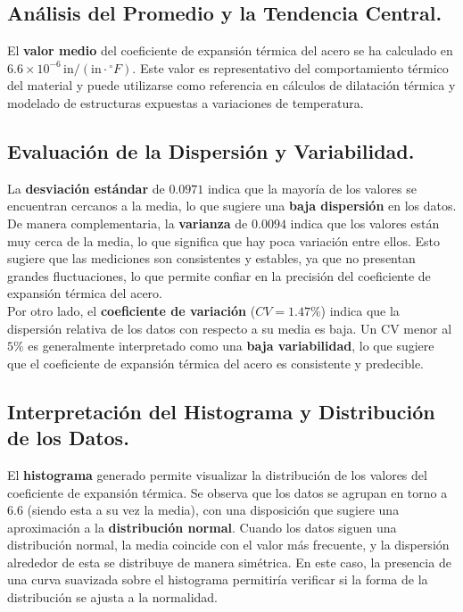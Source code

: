 \documentclass{article}
\begin{document}
\subsection{Análisis del Promedio y la Tendencia Central.}
El \textbf{valor medio} del coeficiente de expansión térmica del acero se ha calculado en $6.6 \times 10^{-6} \, \text{in}/(\text{in} \cdot {}^{\circ}F)$. Este valor es representativo del comportamiento térmico del material y puede utilizarse como referencia en cálculos de dilatación térmica y modelado de estructuras expuestas a variaciones de temperatura.
\subsection{Evaluación de la Dispersión y Variabilidad.}
La \textbf{desviación estándar} de $0.0971$ indica que la mayoría de los valores se encuentran cercanos a la media, lo que sugiere una \textbf{baja dispersión} en los datos. De manera complementaria, la \textbf{varianza} de $0.0094$ indica que los valores están muy cerca de la media, lo que significa que hay poca variación entre ellos. Esto sugiere que las mediciones son consistentes y estables, ya que no presentan grandes fluctuaciones, lo que permite confiar en la precisión del coeficiente de expansión térmica del acero.\\

Por otro lado, el \textbf{coeficiente de variación} ($CV = 1.47\%$)  indica que la dispersión relativa de los datos con respecto a su media es baja. Un CV menor al $5\%$ es generalmente interpretado como una \textbf{baja variabilidad}, lo que sugiere que el coeficiente de expansión térmica del acero es consistente y predecible.

\subsection{Interpretación del Histograma y Distribución de los Datos.}
El \textbf{histograma} generado permite visualizar la distribución de los valores del coeficiente de expansión térmica. Se observa que los datos se agrupan en torno a $6.6$ (siendo esta a su vez la media), con una disposición que sugiere una aproximación a la \textbf{distribución normal}. Cuando los datos siguen una distribución normal, la media coincide con el valor más frecuente, y la dispersión alrededor de esta se distribuye de manera simétrica. En este caso, la presencia de una curva suavizada sobre el histograma permitiría verificar si la forma de la distribución se ajusta a la normalidad.
\end{document}
